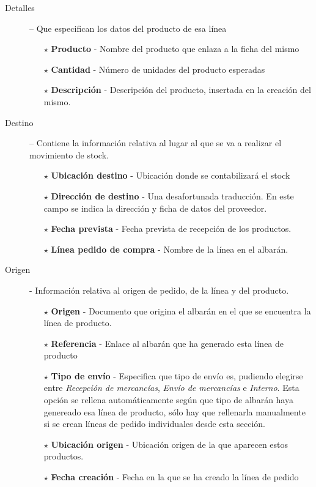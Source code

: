 \begin{description}
  \item[Detalles] -- Que especifican los datos del producto de esa línea
    \begin{itemize}
    \item[$\star$] \textbf{Producto} - Nombre del producto que enlaza a la ficha del mismo
    \item[$\star$] \textbf{Cantidad} - Número de unidades del producto esperadas
    \item[$\star$] \textbf{Descripción} - Descripción del producto, insertada en la creación del mismo.
    \end{itemize}


  \item[Destino] -- Contiene la información relativa al lugar al que se va a realizar el movimiento de stock.
    \begin{itemize}
      \item[$\star$] \textbf{Ubicación destino} - Ubicación donde se contabilizará el stock
      \item[$\star$] \textbf{Dirección de destino} - Una desafortunada traducción. En este campo se indica la dirección y ficha de datos del proveedor.
      \item[$\star$] \textbf{Fecha prevista} - Fecha prevista de recepción de los productos.
      \item[$\star$] \textbf{Línea pedido de compra} - Nombre de la línea en el albarán.
    \end{itemize}

  \item[Origen] - Información relativa al origen de pedido, de la línea y del producto.
    \begin{itemize}
      \item[$\star$] \textbf{Origen} - Documento que origina el albarán en el que se encuentra la línea de producto.
      \item[$\star$] \textbf{Referencia} - Enlace al albarán que ha generado esta línea de producto
      \item[$\star$] \textbf{Tipo de envío} - Especifica que tipo de envío es, pudiendo elegirse entre \emph{Recepción de mercancías}, \emph{Envío de mercancías} e \emph{Interno}.
      Esta opción se rellena automáticamente según que tipo de albarán haya genereado esa línea de producto, sólo hay que rellenarla manualmente si se crean líneas de pedido individuales desde esta sección.
      \item[$\star$] \textbf{Ubicación origen} - Ubicación origen de la que aparecen estos productos.
      \item[$\star$] \textbf{Fecha creación} - Fecha en la que se ha creado la línea de pedido
      
    \end{itemize}
\end{description}


